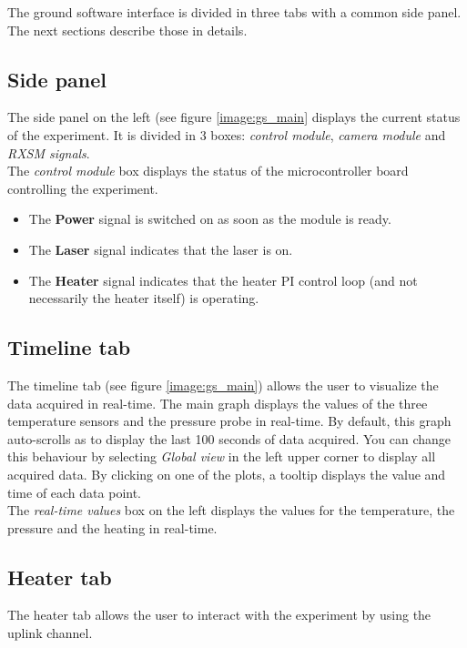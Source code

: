 \documentclass[11pt,a4paper,oneside]{report}
\begin{document}
The ground software interface is divided in three tabs with a common side panel.
The next sections describe those in details.

\subsection{Side panel}

The side panel on the left (see figure \ref{image:gs_main} displays the current status of the experiment.
It is divided in 3 boxes: \emph{control module}, \emph{camera module} and \emph{RXSM signals}. \\

The \emph{control module} box displays the status of the microcontroller board controlling the experiment.
\begin{itemize}
\item The \textbf{Power} signal is switched on as soon as the module is ready.
\item The \textbf{Laser} signal indicates that the laser is on.
\item The \textbf{Heater} signal indicates that the heater PI control loop (and not necessarily the heater itself) is operating.
\end{itemize}

\subsection{Timeline tab}

The timeline tab (see figure \ref{image:gs_main}) allows the user to visualize the data acquired in real-time.
The main graph displays the values of the three temperature sensors and the pressure probe in real-time.
By default, this graph auto-scrolls as to display the last 100 seconds of data acquired.
You can change this behaviour by selecting \emph{Global view} in the left upper corner to display all acquired data.
By clicking on one of the plots, a tooltip displays the value and time of each data point. \\

The \emph{real-time values} box on the left displays the values for the temperature, the pressure and the heating in real-time.

\subsection{Heater tab}

The heater tab allows the user to interact with the experiment by using the uplink channel.
\end{document}

